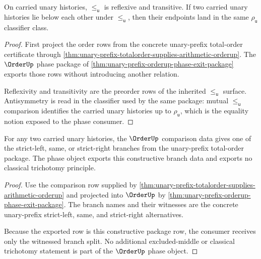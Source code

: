 \begin{theorem}
\label{thm:orderup-preorder-antisymmetry-obligation}
On carried unary histories, $\le_{\mathsf{u}}$ is reflexive and transitive.
If two carried unary histories lie below each other under $\le_{\mathsf{u}}$,
then their endpoints land in the same $\rho_{\mathsf{u}}$ classifier class.
\end{theorem}
\begin{proof}
First project the order rows from the concrete unary-prefix total-order
certificate through
\autoref{thm:unary-prefix-totalorder-supplies-arithmetic-orderup}. The
$\OrderUp$ phase package of
\autoref{thm:unary-prefix-orderup-phase-exit-package} exports those rows
without introducing another relation.

Reflexivity and transitivity are the preorder rows of the inherited
$\le_{\mathsf{u}}$ surface. Antisymmetry is read in the classifier used by the
same package: mutual $\le_{\mathsf{u}}$ comparison identifies the carried
unary histories up to $\rho_{\mathsf{u}}$, which is the equality notion exposed
to the phase consumer.
\end{proof}

\begin{theorem}
\label{thm:orderup-constructive-comparison-obligation}
For any two carried unary histories, the $\OrderUp$ comparison data gives one
of the strict-left, same, or strict-right branches from the unary-prefix
total-order package. The phase object exports this constructive branch data
and exports no classical trichotomy principle.
\end{theorem}
\begin{proof}
Use the comparison row supplied by
\autoref{thm:unary-prefix-totalorder-supplies-arithmetic-orderup} and
projected into $\OrderUp$ by
\autoref{thm:unary-prefix-orderup-phase-exit-package}. The branch names and
their witnesses are the concrete unary-prefix strict-left, same, and
strict-right alternatives.

Because the exported row is this constructive package row, the consumer
receives only the witnessed branch split. No additional excluded-middle or
classical trichotomy statement is part of the $\OrderUp$ phase object.
\end{proof}

